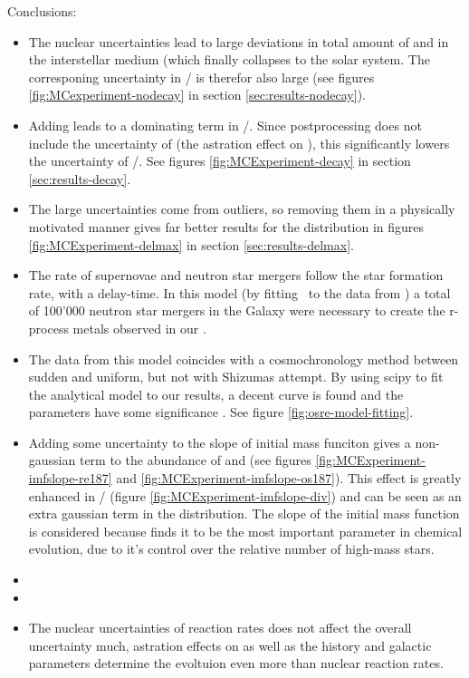 Conclusions:

\begin{itemize}
\item The nuclear uncertainties lead to large deviations in total amount of  and  in the interstellar medium (which finally collapses to the solar system. The corresponing uncertainty in / is therefor also large (see figures \ref{fig:MCexperiment-nodecay} in section \ref{sec:results-nodecay}).
\item Adding \betadecay leads to a dominating term in /. Since postprocessing does not include the uncertainty of \betadecay (the astration effect on ), this significantly lowers the uncertainty of /. See figures \ref{fig:MCExperiment-decay} in section \ref{sec:results-decay}.
\item The large uncertainties come from outliers, so removing them in a physically motivated manner gives far better results for the distribution in figures \ref{fig:MCExperiment-delmax} in section \ref{sec:results-delmax}.
\item The rate of supernovae and neutron star mergers follow the star formation rate, with a delay-time. In this model (by fitting \omegamodel\ to the data from \eris) a total of 100'000 neutron star mergers in the Galaxy were necessary to create the r-process metals observed in our \sos.
\item The data from this model coincides with a cosmochronology method between sudden and uniform, but not with Shizumas attempt. By using scipy to fit the analytical model to our results, a decent curve is found and the parameters have some significance . See figure \ref{fig:osre-model-fitting}.
\item Adding some uncertainty to the slope of initial mass funciton gives a non-gaussian term to the abundance of  and  (see figures \ref{fig:MCExperiment-imfslope-re187} and \ref{fig:MCExperiment-imfslope-os187}). This effect is greatly enhanced in / (figure \ref{fig:MCExperiment-imfslope-div}) and can be seen as an extra gaussian term in the distribution. The slope of the initial mass function is considered because  finds it to be the most important parameter in chemical evolution, due to it's control over the relative number of high-mass stars.
\item {}
  \item {}
  \item The nuclear uncertainties of reaction rates does not affect the overall uncertainty much, astration effects on  as well as the history and galactic parameters determine the evoltuion even more than nuclear reaction rates.
\end{itemize}

